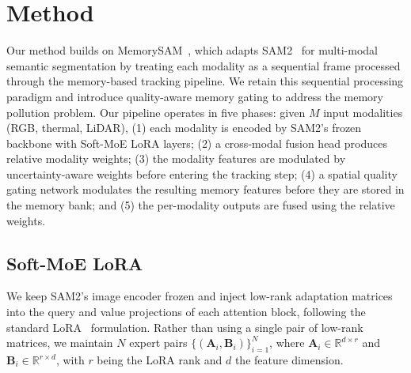 \section{Method}
\label{sec:method}


Our method builds on MemorySAM~\cite{chen2025memorysam}, which adapts SAM2~\cite{ravi2024sam2} for multi-modal semantic segmentation by treating each modality as a sequential frame processed through the memory-based tracking pipeline.
We retain this sequential processing paradigm and introduce quality-aware memory gating to address the memory pollution problem.
Our pipeline operates in five phases: given $M$ input modalities (RGB, thermal, LiDAR), (1) each modality is encoded by SAM2's frozen backbone with Soft-MoE LoRA layers; (2) a cross-modal fusion head produces relative modality weights; (3) the modality features are modulated by uncertainty-aware weights before entering the tracking step; (4) a spatial quality gating network modulates the resulting memory features before they are stored in the memory bank; and (5) the per-modality outputs are fused using the relative weights.


\subsection{Soft-MoE LoRA}
\label{sec:soft_moe_lora}

We keep SAM2's image encoder frozen and inject low-rank adaptation matrices into the query and value projections of each attention block, following the standard LoRA~\cite{hu2022lora} formulation.
Rather than using a single pair of low-rank matrices, we maintain $N$ expert pairs $\{(\mathbf{A}_i, \mathbf{B}_i)\}_{i=1}^{N}$, where $\mathbf{A}_i \in \mathbb{R}^{d \times r}$ and $\mathbf{B}_i \in \mathbb{R}^{r \times d}$, with $r$ being the LoRA rank and $d$ the feature dimension.

